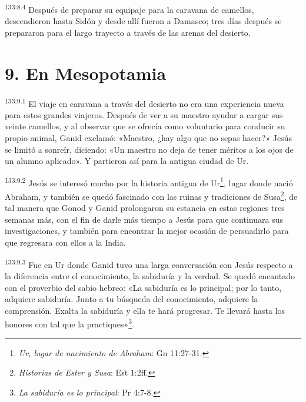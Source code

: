 \par 
\textsuperscript{133:8.4} Después de preparar su equipaje para la caravana de camellos, descendieron hasta Sidón y desde allí fueron a Damasco; tres días después se prepararon para el largo trayecto a través de las arenas del desierto.

\section*{9. En Mesopotamia}
\par 
\textsuperscript{133:9.1} El viaje en caravana a través del desierto no era una experiencia nueva para estos grandes viajeros. Después de ver a su maestro ayudar a cargar sus veinte camellos, y al observar que se ofrecía como voluntario para conducir su propio animal, Ganid exclamó: «Maestro, ¿hay algo que no sepas hacer?» Jesús se limitó a sonreír, diciendo: «Un maestro no deja de tener méritos a los ojos de un alumno aplicado». Y partieron así para la antigua ciudad de Ur.

\par 
\textsuperscript{133:9.2} Jesús se interesó mucho por la historia antigua de Ur\footnote{\textit{Ur, lugar de nacimiento de Abraham}: Gn 11:27-31.}, lugar donde nació Abraham, y también se quedó fascinado con las ruinas y tradiciones de Susa\footnote{\textit{Historias de Ester y Susa}: Est 1:2ff.}, de tal manera que Gonod y Ganid prolongaron su estancia en estas regiones tres semanas más, con el fin de darle más tiempo a Jesús para que continuara sus investigaciones, y también para encontrar la mejor ocasión de persuadirlo para que regresara con ellos a la India.

\par 
\textsuperscript{133:9.3} Fue en Ur donde Ganid tuvo una larga conversación con Jesús respecto a la diferencia entre el conocimiento, la sabiduría y la verdad. Se quedó encantado con el proverbio del sabio hebreo: «La sabiduría es lo principal; por lo tanto, adquiere sabiduría. Junto a tu búsqueda del conocimiento, adquiere la comprensión. Exalta la sabiduría y ella te hará progresar. Te llevará hasta los honores con tal que la practiques»\footnote{\textit{La sabiduría es lo principal}: Pr 4:7-8.}.

